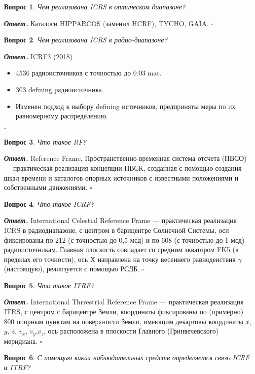 \documentclass[12pt]{article}
\newtheorem{problem}{Вопрос}
\newenvironment{solution}[1][\it{Ответ}]{\textbf{#1. } }{$\square$}
\begin{document}
	\begin{problem}
	Чем реализована ICRS в оптическом диапазоне?
	\end{problem}
	\begin{solution}
Каталоги HIPPARCOS (заменил HCRF), TYCHO, GAIA.
	\end{solution}
	
	
	\begin{problem}
		Чем реализована ICRS в радио-диапазоне?
	\end{problem}
	\begin{solution}
		ICRF3 (2018)
		\begin{itemize}
						\item 4536 радиоисточников с точностью до 0.03 mas.
			\item 303 defining радиоисточника.
			\item Изменен подход к выбору defining источников, предприняты меры по их равномерному распределению.
		\end{itemize}
	\end{solution}
	\begin{problem}
		Что такое RF?
	\end{problem}
	
	\begin{solution}
	Reference Frame, Пространственно-временная система отсчета (ПВСО) — практическая
	реализация концепции ПВСК, созданная с помощью создания шкал времени и каталогов
	опорных источников с известными положениями и собственными движениями.
	\end{solution}
	
	
		\begin{problem}
		Что такое ICRF?
	\end{problem}
	
	\begin{solution}
		International Celestial Reference Frame — практическая реализация ICRS в радиодиапазоне, с центром в барицентре Солнечной Системы, оси фиксированы по 212 (с точностью до 0,5 мсд) и по 608 (с точностью до 1 мсд) радиоисточникам. Главная плоскость совпадает со средним экватором FK5 (в пределах его точности), ось Х направлена на точку весеннего равноденствия $\gamma$ (настоящую), реализуется с помощью РСДБ.
	\end{solution}
		\begin{problem}
		Что такое ITRF?
	\end{problem}
	
	\begin{solution}
		International Thrrestrial Reference Frame — практическая реализация ITRS, с центром с барицентре Земли, координаты фиксированы по (примерно) 800 опорным пунктам	на поверхности Земли, имеющим декартовы координаты $x$, $y$, $z$, $v_x$, $v_y$,$v_z$, ось расположена
		в плоскости Главного (Гринвечевского) меридиана.
	\end{solution}
		\begin{problem}
		С помощью каких наблюдательных средств определяется связь ICRF и ITRF?
	\end{problem}
	
\end{document}
